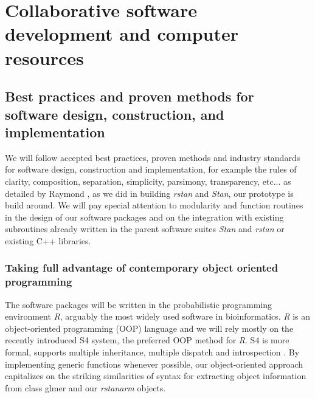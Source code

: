 \documentclass[11pt,notitlepage]{article}
\begin{document}
\section*{Collaborative software development and computer resources}

\subsection*{Best practices and proven methods for software design, construction, and implementation}
We will follow accepted best practices, proven methods and industry standards for software design, construction and implementation, for example the rules of clarity, composition, separation, simplicity, parsimony, transparency, etc... as detailed by Raymond \cite{Raymond2003art}, as we did in building \textit{rstan} and \textit{Stan}, our  prototype is build around. We will pay special attention to modularity and function routines in the design of our software packages and on the integration with existing subroutines already written in the parent software suites \textit{Stan} and \textit{rstan} or existing C++ libraries. 

\subsubsection*{Taking full advantage of contemporary object oriented programming}
The software packages will be written in the probabilistic programming environment \textit{R}, arguably the most widely used software in bioinformatics. \textit{R} is an object-oriented programming (OOP) language and we will rely mostly on the recently introduced S4 system, the preferred OOP method for \textit{R}. S4 is more formal, supports multiple inheritance, multiple dispatch and introspection \cite{Chambers2014object}. By implementing generic functions whenever possible, our object-oriented approach capitalizes on the striking similarities of syntax for extracting object information from class glmer and our \textit{rstanarm} objects. 
\end{document}
